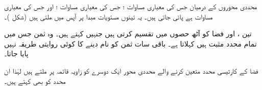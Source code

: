 محددی محوروں کے درمیان  جس کی معیاری مساوات ؛  جس کی معیاری مساوات ؛ اور  جس کی معیاری مساوات  ہے پائی جاتی ہیں۔ یہ تینوں مستویات  مبدا  پر آپس میں ملتی ہیں (شکل )۔

تین  ،  اور  فضا کو آٹھ حصوں میں تقسیم کرتی  ہیں جنہیں  کہتے ہیں۔ وہ ثمن جس میں تمام محدد مثبت ہیں  کہلاتا ہے۔ باقی سات ثمن کو نام دینے کا کوئی روایتی طریقہ نہیں پایا جاتا۔

فضا کے کارتیسی محدد  متعین کرنے والے  محددی محور  ایک دوسرے کو زاویہ قائمہ پر ملتے ہیں لہٰذا ان محدد  کو  بھی کہتے ہیں۔  

